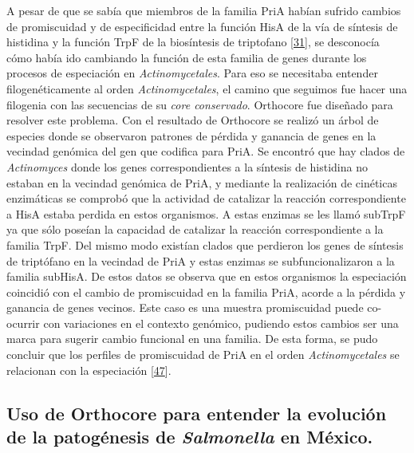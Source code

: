 \documentclass[12pt,twoside]{reedthesis}
\begin{document}
  A pesar de que se sabía que miembros de la familia PriA habían sufrido
  cambios de promiscuidad y de especificidad entre la función HisA de la
  vía de síntesis de histidina y la función TrpF de la biosíntesis de
  triptofano {[}\protect\hyperlink{ref-noda-garcia_evolution_2013}{31}{]},
  se desconocía cómo había ido cambiando la función de esta familia de
  genes durante los procesos de especiación en \emph{Actinomycetales}.
  Para eso se necesitaba entender filogenéticamente al orden
  \emph{Actinomycetales}, el camino que seguimos fue hacer una filogenia
  con las secuencias de su \emph{core conservado}. Orthocore fue diseñado
  para resolver este problema. Con el resultado de Orthocore se realizó un
  árbol de especies donde se observaron patrones de pérdida y ganancia de
  genes en la vecindad genómica del gen que codifica para PriA. Se
  encontró que hay clados de \emph{Actinomyces} donde los genes
  correspondientes a la síntesis de histidina no estaban en la vecindad
  genómica de PriA, y mediante la realización de cinéticas enzimáticas se
  comprobó que la actividad de catalizar la reacción correspondiente a
  HisA estaba perdida en estos organismos. A estas enzimas se les llamó
  subTrpF ya que sólo poseían la capacidad de catalizar la reacción
  correspondiente a la familia TrpF. Del mismo modo existían clados que
  perdieron los genes de síntesis de triptófano en la vecindad de PriA y
  estas enzimas se subfuncionalizaron a la familia subHisA. De estos datos
  se observa que en estos organismos la especiación coincidió con el
  cambio de promiscuidad en la familia PriA, acorde a la pérdida y
  ganancia de genes vecinos. Este caso es una muestra promiscuidad puede
  co-ocurrir con variaciones en el contexto genómico, pudiendo estos
  cambios ser una marca para sugerir cambio funcional en una familia. De
  esta forma, se pudo concluir que los perfiles de promiscuidad de PriA en
  el orden \emph{Actinomycetales} se relacionan con la especiación
  {[}\protect\hyperlink{ref-juarez-vazquez_evolution_2017}{47}{]}.
  
  \subsection{\texorpdfstring{Uso de Orthocore para entender la evolución
  de la patogénesis de \emph{Salmonella} en
  México.}{Uso de Orthocore para entender la evolución de la patogénesis de Salmonella en México.}}\label{uso-de-orthocore-para-entender-la-evolucion-de-la-patogenesis-de-salmonella-en-mexico.}
  
\end{document}
